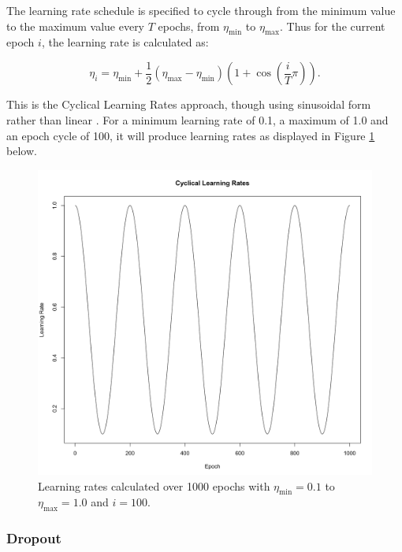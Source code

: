 \documentclass[a4paper,11pt,oneside]{article}
\theoremstyle{plain}
\theoremstyle{definition}
\begin{document}
	The learning rate schedule is specified to cycle through from the minimum value to the maximum value every $T$ epochs, from $\eta_{\min}$ to $\eta_{\max}$. Thus for the current epoch $i$, the learning rate is calculated as:
	
	\begin{equation}\label{func_learning_rate_sched}
	\eta_{i}={\eta_{\min} }+\frac{1}{2}\left(\eta_{\max}- \eta_{\min}\right)\left(1+\cos \left(\frac{i}{T} \pi\right)\right) .
	\end{equation}
	
	This is the Cyclical Learning Rates approach, though using sinusoidal form rather than linear \citep{Smith}. For a minimum learning rate of 0.1, a maximum of 1.0 and an epoch cycle of 100, it will produce learning rates as displayed in Figure \ref{figure-SGDRLearningRates} below.
	
	\begin{figure}[H]
		\centering
		\includegraphics[scale=0.2]{images/implementation/CyclicalLearningRates.png}
		\caption[Cyclical Learning Rate Diagram]{Learning rates calculated over 1000 epochs with $\eta_{\min} = 0.1$ to $\eta_{\max}= 1.0$ and $i=100$.}
		\label{figure-SGDRLearningRates}
	\end{figure}
	
	\subsubsection{Dropout}\label{imp_dropout}
	
\end{document}
